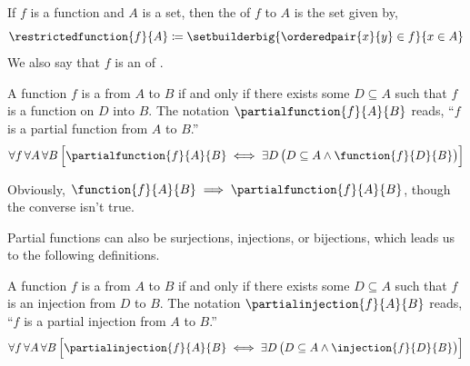 \begin{dfn}[Restriction]
    \label{dfn:restricted-function}
    If \( f \) is a function and \( A \) is a set, then the  of \( f \) to \( A \)
    is the set given by,
    \begin{equation*}
        \restrictedfunction{f}{A} \coloneq \setbuilderbig{\orderedpair{x}{y} \in f}{x \in A}
    \end{equation*}
    We also say that \( f \) is an  of .
\end{dfn}

\begin{dfn}
    \label{dfn:partial-function}
    A function \( f \) is a  from \( A \) to \( B \) if and only if
    there exists some \( D \subseteq A \) such that \( f \) is a function on \( D \) into \( B \).
    The notation \( \partialfunction{f}{A}{B} \) reads, ``\( f \) is a partial function from \( A \) to \( B \).''
    \begin{equation*}
        \forall f \, \forall A \, \forall B \,
        \Big[ \partialfunction{f}{A}{B} \iff \exists D \, \big( D \subseteq A \land \function{f}{D}{B} \big) \Big]
    \end{equation*}
\end{dfn}

\begin{rem}
    Obviously, \( \function{f}{A}{B} \implies \partialfunction{f}{A}{B} \), though the converse isn't true.
\end{rem}

\vspace{0.2cm}
\noindent
Partial functions can also be surjections, injections, or bijections, which leads us to the following definitions.

\begin{dfn}
    \label{dfn:partial-injection}
    A function \( f \) is a  from \( A \) to \( B \) if and only if there exists some \( D \subseteq A \)
    such that \( f \) is an injection from \( D \) to \( B \). The notation \( \partialinjection{f}{A}{B} \) reads,
    ``\( f \) is a partial injection from \( A \) to \( B \).''
    \begin{equation*}
        \forall f \, \forall A \, \forall B \, \Big[ \partialinjection{f}{A}{B} \iff \exists D \, \big( D \subseteq A \land \injection{f}{D}{B} \big) \Big]
    \end{equation*}
\end{dfn}


